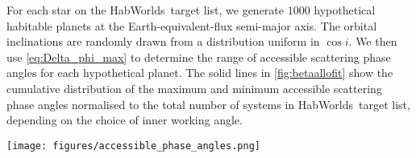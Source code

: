 \documentclass[
    usenatbib,
]{mnras}
\newcommand{\todo}[1]{\textcolor{red}{[#1]}}
\newcommand{\IWA}{\ensuremath{\mathrm{IWA}}}
\newcommand{\hwo}{HabWorlds}
\begin{document}
For each star on the \hwo\ target list, we generate $1000$  hypothetical habitable planets at the Earth-equivalent-flux semi-major axis. 
%
The orbital inclinations are randomly drawn from a distribution uniform in $\cos i$. 
%
We then use \cref{eq:Delta_phi_max} to determine the range of accessible scattering phase angles for each hypothetical planet.
%
The solid lines in \cref{fig:betaallofit} show the cumulative distribution of the maximum and minimum accessible scattering phase angles normalised to the total number of systems in \hwo\ target list, depending on the choice of inner working angle.  


\begin{figure*}[t]
    \centering
    \texttt{[image: figures/accessible\_phase\_angles.png]}  
    \caption{
        \todo{shouldn't lambda/D for 600nm give 21, 41, 62, 83 mas?} 
        Cumulative distributions of the most extreme scattering phase angle accessible for different \IWA where the solid lines are for randomly inclined circular orbits and the dashed lines are for randomly orientated elliptical orbits.
        The top x axis indicates the minimum scattering phase angle and the bottom x axis indicates the maximum.
        These are symmetric about quadrature (90 degrees) \todo{is this true for elliptical orbits?}.
        The y axis indicates the number of systems divided by the number of Monte Carlo samples and is thus normalised to the number of systems in the target list.
        The secondary y axis indicates the number of systems assuming only 24 percent of them contain an Earth-like exoplanet in the habitable zone.
    }
    \label{fig:betaallofit}
\end{figure*}
\end{document}
